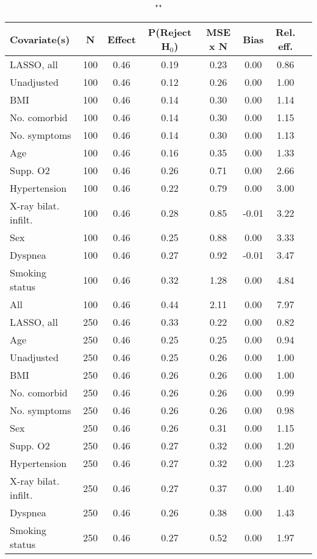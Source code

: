 \documentclass{article}
\begin{document}
{\tabcolsep=6pt  %
\begin{longtable}{lccccccc}
\caption{""} \\
Covariate(s) & N & Effect & P(Reject H$_0$) & MSE x N & Bias & Rel. eff.\\ \midrule
LASSO, all & 100 & 0.46 & 0.19 & 0.23 &  0.00 & 0.86 \\ 
Unadjusted & 100 & 0.46 & 0.12 & 0.26 &  0.00 & 1.00 \\ 
BMI & 100 & 0.46 & 0.14 & 0.30 &  0.00 & 1.14 \\ 
No. comorbid & 100 & 0.46 & 0.14 & 0.30 &  0.00 & 1.15 \\ 
No. symptoms & 100 & 0.46 & 0.14 & 0.30 &  0.00 & 1.13 \\ 
Age & 100 & 0.46 & 0.16 & 0.35 &  0.00 & 1.33 \\ 
Supp. O2 & 100 & 0.46 & 0.26 & 0.71 &  0.00 & 2.66 \\ 
Hypertension & 100 & 0.46 & 0.22 & 0.79 &  0.00 & 3.00 \\ 
X-ray bilat. infilt. & 100 & 0.46 & 0.28 & 0.85 & -0.01 & 3.22 \\ 
Sex & 100 & 0.46 & 0.25 & 0.88 &  0.00 & 3.33 \\ 
Dyspnea & 100 & 0.46 & 0.27 & 0.92 & -0.01 & 3.47 \\ 
Smoking status & 100 & 0.46 & 0.32 & 1.28 &  0.00 & 4.84 \\ 
All & 100 & 0.46 & 0.44 & 2.11 &  0.00 & 7.97 \\ \midrule 
LASSO, all & 250 & 0.46 & 0.33 & 0.22 &  0.00 & 0.82 \\ 
Age & 250 & 0.46 & 0.25 & 0.25 &  0.00 & 0.94 \\ 
Unadjusted & 250 & 0.46 & 0.25 & 0.26 &  0.00 & 1.00 \\ 
BMI & 250 & 0.46 & 0.26 & 0.26 &  0.00 & 1.00 \\ 
No. comorbid & 250 & 0.46 & 0.26 & 0.26 &  0.00 & 0.99 \\ 
No. symptoms & 250 & 0.46 & 0.26 & 0.26 &  0.00 & 0.98 \\ 
Sex & 250 & 0.46 & 0.26 & 0.31 &  0.00 & 1.15 \\ 
Supp. O2 & 250 & 0.46 & 0.27 & 0.32 &  0.00 & 1.20 \\ 
Hypertension & 250 & 0.46 & 0.27 & 0.32 &  0.00 & 1.23 \\ 
X-ray bilat. infilt. & 250 & 0.46 & 0.27 & 0.37 &  0.00 & 1.40 \\ 
Dyspnea & 250 & 0.46 & 0.26 & 0.38 &  0.00 & 1.43 \\ 
Smoking status & 250 & 0.46 & 0.27 & 0.52 &  0.00 & 1.97 \\ 

\end{longtable}}
\end{document}
